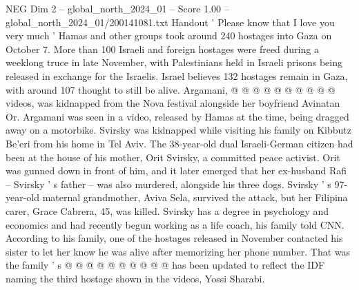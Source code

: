 \begin{textsample}{NEG Dim 2 – global\_north\_2024\_01 – Score 1.00 – global\_north\_2024\_01/200141081.txt}
Handout ' Please know that I love you very much ' Hamas and other groups took around 240 hostages into Gaza on October 7.
More than 100 Israeli and foreign hostages were freed during a weeklong truce in late November, with Palestinians held in Israeli prisons being released in exchange for the Israelis.
Israel believes 132 hostages remain in Gaza, with around 107 thought to still be alive.
Argamani, @ @ @ @ @ @ @ @ @ @ videos, was kidnapped from the Nova festival alongside her boyfriend Avinatan Or.
Argamani was seen in a video, released by Hamas at the time, being dragged away on a motorbike.
Svirsky was kidnapped while visiting his family on Kibbutz Be'eri from his home in Tel Aviv.
The 38-year-old dual Israeli-German citizen had been at the house of his mother, Orit Svirsky, a committed peace activist.
Orit was gunned down in front of him, and it later emerged that her ex-husband Rafi -- Svirsky ' s father -- was also murdered, alongside his three dogs.
Svirsky ' s 97-year-old maternal grandmother, Aviva Sela, survived the attack, but her Filipina carer, Grace Cabrera, 45, was killed.
Svirsky has a degree in psychology and economics and had recently begun working as a life coach, his family told CNN.
According to his family, one of the hostages released in November contacted his sister to let her know he was alive after memorizing her phone number.
That was the family ' s @ @ @ @ @ @ @ @ @ @ has been updated to reflect the IDF naming the third hostage shown in the videos, Yossi Sharabi.

\end{textsample}
